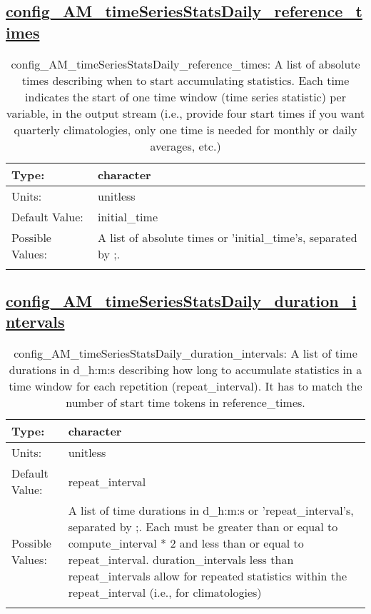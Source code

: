 \subsection[config\_AM\_timeSeriesStatsDaily\_reference\_times]{\hyperref[sec:nm_tab_AM_timeSeriesStatsDaily]{config\_AM\_timeSeriesStatsDaily\_reference\_times}}
\label{subsec:nm_sec_config_AM_timeSeriesStatsDaily_reference_times}
\begin{center}
\begin{longtable}{| p{2.0in} || p{4.0in} |}
    \hline
    Type: & character \\
    \hline
    Units: & \si{unitless} \\
    \hline
    Default Value: & initial\_time \\
    \hline
    Possible Values: & A list of absolute times or 'initial\_time's, separated by ;. \\
    \hline
    \caption{config\_AM\_timeSeriesStatsDaily\_reference\_times: A list of absolute times describing when to start accumulating statistics. Each time indicates the start of one time window (time series statistic) per variable, in the output stream (i.e., provide four start times if you want quarterly climatologies, only one time is needed for monthly or daily averages, etc.)}
\end{longtable}
\end{center}
\subsection[config\_AM\_timeSeriesStatsDaily\_duration\_intervals]{\hyperref[sec:nm_tab_AM_timeSeriesStatsDaily]{config\_AM\_timeSeriesStatsDaily\_duration\_intervals}}
\label{subsec:nm_sec_config_AM_timeSeriesStatsDaily_duration_intervals}
\begin{center}
\begin{longtable}{| p{2.0in} || p{4.0in} |}
    \hline
    Type: & character \\
    \hline
    Units: & \si{unitless} \\
    \hline
    Default Value: & repeat\_interval \\
    \hline
    Possible Values: & A list of time durations in d\_h:m:s or 'repeat\_interval's, separated by ;. Each must be greater than or equal to compute\_interval * 2 and less than or equal to repeat\_interval. duration\_intervals less than repeat\_intervals allow for repeated statistics within the repeat\_interval (i.e., for climatologies) \\
    \hline
    \caption{config\_AM\_timeSeriesStatsDaily\_duration\_intervals: A list of time durations in d\_h:m:s describing how long to accumulate statistics in a time window for each repetition (repeat\_interval). It has to match the number of start time tokens in reference\_times.}
\end{longtable}
\end{center}
